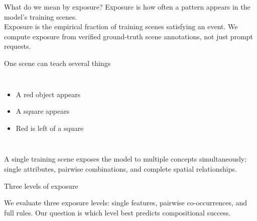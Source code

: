 \documentclass[aspectratio=169,11pt]{beamer}
\begin{document}
\begin{frame}{What do we mean by exposure?}
\Large Exposure is how often a pattern appears in the model's training scenes.
\vspace{4mm}\\
\normalsize Exposure is the empirical fraction of training scenes satisfying an event. We compute exposure from verified ground-truth scene annotations, not just prompt requests.
\end{frame}

\begin{frame}{One scene can teach several things}
\begin{columns}
\centering{}
\begin{itemize}\item A red object appears\item A square appears\item Red is left of a square\end{itemize}
\end{columns}
\vspace{3mm}
\normalsize A single training scene exposes the model to multiple concepts simultaneously: single attributes, pairwise combinations, and complete spatial relationships.
\end{frame}

\begin{frame}{Three levels of exposure}
\begin{center}\end{center}
\vspace{2mm}
\normalsize We evaluate three exposure levels: single features, pairwise co-occurrences, and full rules. Our question is which level best predicts compositional success.
\end{frame}
\end{document}

